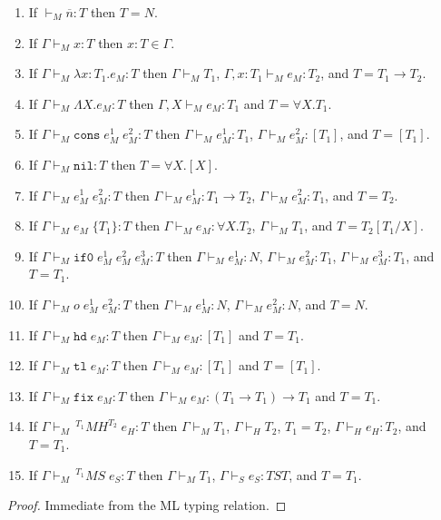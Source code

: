 \begin{mi}
\label{mi}
\mbox{}
\begin{enumerate}
\item If $\vdash_{M}\overline{n}:T$ then $T=N$.
\item If $\Gamma\vdash_{M}x:T$ then $x:T\in\Gamma$.
\item If $\Gamma\vdash_{M}\lambda x:T_{1}.e_{M}:T$ then $\Gamma\vdash_{M}T_{1}$, $\Gamma,x:T_{1}\vdash_{M}e_{M}:T_{2}$, and $T=T_{1}\rightarrow T_{2}$.
\item If $\Gamma\vdash_{M}\Lambda X.e_{M}:T$ then $\Gamma,X\vdash_{M}e_{M}:T_{1}$ and $T=\forall X.T_{1}$.
\item If $\Gamma\vdash_{M}\mathtt{cons}\;e_{M}^{1}\;e_{M}^{2}:T$ then $\Gamma\vdash_{M}e_{M}^{1}:T_{1}$, $\Gamma\vdash_{M}e_{M}^{2}:[T_{1}]$, and $T=[T_{1}]$.
\item If $\Gamma\vdash_{M}\mathtt{nil}:T$ then $T=\forall X.[X]$.
\item If $\Gamma\vdash_{M}e_{M}^{1}\;e_{M}^{2}:T$ then $\Gamma\vdash_{M}e_{M}^{1}:T_{1}\rightarrow T_{2}$, $\Gamma\vdash_{M}e_{M}^{2}:T_{1}$, and $T=T_{2}$.
\item If $\Gamma\vdash_{M}e_{M}\;\lbrace T_{1}\rbrace:T$ then $\Gamma\vdash_{M}e_{M}:\forall X.T_{2}$, $\Gamma\vdash_{M}T_{1}$, and $T=T_{2}[T_{1}/X]$.
\item If $\Gamma\vdash_{M}\mathtt{if0}\;e_{M}^{1}\;e_{M}^{2}\;e_{M}^{3}:T$ then $\Gamma\vdash_{M}e_{M}^{1}:N$, $\Gamma\vdash_{M}e_{M}^{2}:T_{1}$, $\Gamma\vdash_{M}e_{M}^{3}:T_{1}$, and $T=T_{1}$.
\item If $\Gamma\vdash_{M}o\;e_{M}^{1}\;e_{M}^{2}:T$ then $\Gamma\vdash_{M}e_{M}^{1}:N$, $\Gamma\vdash_{M}e_{M}^{2}:N$, and $T=N$.
\item If $\Gamma\vdash_{M}\mathtt{hd}\;e_{M}:T$ then $\Gamma\vdash_{M}e_{M}:[T_{1}]$ and $T=T_{1}$.
\item If $\Gamma\vdash_{M}\mathtt{tl}\;e_{M}:T$ then $\Gamma\vdash_{M}e_{M}:[T_{1}]$ and $T=[T_{1}]$.
\item If $\Gamma\vdash_{M}\mathtt{fix}\;e_{M}:T$ then $\Gamma\vdash_{M}e_{M}:(T_{1}\rightarrow T_{1})\rightarrow T_{1}$ and $T=T_{1}$.
\item If $\Gamma\vdash_{M}\,^{T_{1}}MH^{T_{2}}\;e_{H}:T$ then $\Gamma\vdash_{M}T_{1}$, $\Gamma\vdash_{H}T_{2}$, $T_{1}=T_{2}$, $\Gamma\vdash_{H}e_{H}:T_{2}$, and $T=T_{1}$.
\item If $\Gamma\vdash_{M}\,^{T_{1}}MS\;e_{S}:T$ then $\Gamma\vdash_{M}T_{1}$, $\Gamma\vdash_{S}e_{S}:TST$, and $T=T_{1}$.
\end{enumerate}
\begin{proof}
Immediate from the ML typing relation.
\end{proof}
\end{mi}